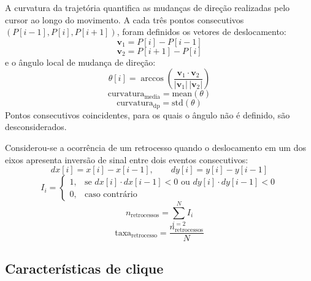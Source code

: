 A curvatura da trajetória quantifica as mudanças de direção realizadas pelo cursor ao longo do movimento. A cada três pontos consecutivos $(P[i-1], P[i], P[i+1])$, foram definidos os vetores de deslocamento:
\begin{equation}
    \mathbf{v}_1 = P[i] - P[i-1]
    \label{eq:v1}
\end{equation}
\begin{equation}
    \mathbf{v}_2 = P[i+1] - P[i]
    \label{eq:v2}
\end{equation}
e o ângulo local de mudança de direção:
\begin{equation}
    \theta[i] = \arccos\left(\frac{\mathbf{v}_1 \cdot \mathbf{v}_2}{|\mathbf{v}_1|\,|\mathbf{v}_2|}\right)
    \label{eq:theta}
\end{equation}
\begin{equation}
    \text{curvatura}_{\text{media}} = \text{mean}(\theta)
    \label{eq:curvatura_media}
\end{equation}
\begin{equation}
    \text{curvatura}_{\text{dp}} = \text{std}(\theta)
    \label{eq:curvatura_dp}
\end{equation}
Pontos consecutivos coincidentes, para os quais o ângulo não é definido, são desconsiderados.

Considerou-se a ocorrência de um retrocesso quando o deslocamento em um dos eixos apresenta inversão de sinal entre dois eventos consecutivos:
\begin{equation}
    dx[i] = x[i] - x[i-1], \qquad dy[i] = y[i] - y[i-1]
    \label{eq:dx_dy}
\end{equation}
\begin{equation}
    I_i =
    \begin{cases}
        1, & \text{se } dx[i] \cdot dx[i-1] < 0 \text{ ou } dy[i] \cdot dy[i-1] < 0 \\
        0, & \text{caso contrário}
    \end{cases}
    \label{eq:inversao}
\end{equation}
\begin{equation}
    n_{\text{retrocessos}} = \sum_{i=2}^{N} I_i
    \label{eq:n_retrocessos}
\end{equation}
\begin{equation}
    \text{taxa}_{\text{retrocesso}} = \frac{n_{\text{retrocessos}}}{N}
    \label{eq:taxa_retrocesso}
\end{equation}

\subsection{Características de clique}

